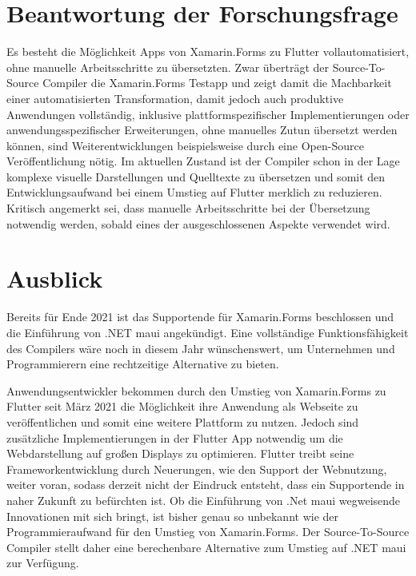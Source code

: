 \section{Beantwortung der Forschungsfrage}
Es besteht die Möglichkeit Apps von Xamarin.Forms zu Flutter vollautomatisiert, ohne manuelle 
Arbeitsschritte zu übersetzten. Zwar überträgt der Source-To-Source Compiler die Xamarin.Forms Testapp und zeigt damit die Machbarkeit einer automatisierten Transformation,  damit jedoch auch produktive Anwendungen vollständig, inklusive plattformspezifischer Implementierungen oder 
anwendungsspezifischer Erweiterungen, ohne manuelles Zutun übersetzt werden können,  sind 
Weiterentwicklungen beispielsweise durch eine Open-Source Veröffentlichung nötig.
Im aktuellen Zustand ist der Compiler schon in der Lage komplexe visuelle Darstellungen
und Quelltexte zu übersetzen und somit den Entwicklungsaufwand bei einem Umstieg auf Flutter 
merklich zu reduzieren.
Kritisch angemerkt sei,  dass manuelle Arbeitsschritte bei der Übersetzung notwendig werden,  sobald eines der ausgeschlossenen Aspekte verwendet wird.


\section{Ausblick}
Bereits für Ende 2021 ist das Supportende für Xamarin.Forms beschlossen und die Einführung von 
.NET \ac{maui} angekündigt.  Eine vollständige Funktionsfähigkeit des Compilers wäre noch in diesem Jahr wünschenswert,  um Unternehmen und Programmierern eine rechtzeitige Alternative zu bieten. 

Anwendungsentwickler bekommen durch den Umstieg von Xamarin.Forms zu Flutter seit März 2021 die Möglichkeit ihre Anwendung als Webseite zu veröffentlichen und somit eine weitere Plattform zu nutzen.  Jedoch sind zusätzliche Implementierungen in der Flutter App notwendig um die Webdarstellung auf großen Displays zu optimieren.  Flutter treibt seine Frameworkentwicklung durch Neuerungen, wie den Support der Webnutzung,  weiter voran,  sodass derzeit nicht der 
Eindruck entsteht, dass ein Supportende in naher Zukunft zu befürchten ist. 
Ob die Einführung von .Net \ac{maui} wegweisende Innovationen mit sich bringt,  ist bisher genau so unbekannt wie der Programmieraufwand für den Umstieg von Xamarin.Forms.  
Der Source-To-Source Compiler stellt daher eine berechenbare Alternative zum Umstieg auf .NET  \ac{maui} zur Verfügung. 
